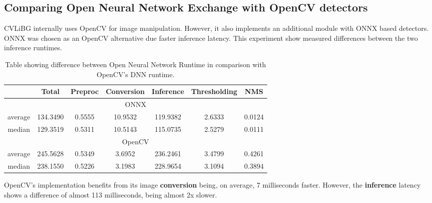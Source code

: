 \subsection{Comparing Open Neural Network Exchange with OpenCV detectors}
CVLiBG internally uses OpenCV for image manipulation. However, it also implements an additional module with ONNX based detectors. ONNX was chosen as an OpenCV alternative due faster inference latency. This experiment show measured differences between the two inference runtimes.

\begin{table}[hbt]
\caption{Table showing difference between Open Neural Network Runtime in comparison with OpenCV's DNN runtime.}
\centering
\begin{tabular}{|ccccccc|}
\hline
\multicolumn{1}{|c|}{} &
  \multicolumn{1}{c|}{Total} &
  \multicolumn{1}{c|}{Preproc} &
  \multicolumn{1}{c|}{Conversion} &
  \multicolumn{1}{c|}{Inference} &
  \multicolumn{1}{c|}{Thresholding} &
  NMS \\ \hline
\multicolumn{7}{|c|}{ONNX} \\ \hline
\multicolumn{1}{|c|}{average} &
  \multicolumn{1}{c|}{134.3490} &
  \multicolumn{1}{c|}{0.5555} &
  \multicolumn{1}{c|}{10.9532} &
  \multicolumn{1}{c|}{119.9382} &
  \multicolumn{1}{c|}{2.6333} &
  0.0124 \\ \hline
\multicolumn{1}{|c|}{median} &
  \multicolumn{1}{c|}{129.3519} &
  \multicolumn{1}{c|}{0.5311} &
  \multicolumn{1}{c|}{10.5143} &
  \multicolumn{1}{c|}{115.0735} &
  \multicolumn{1}{c|}{2.5279} &
  0.0111 \\ \hline
\multicolumn{7}{|c|}{OpenCV} \\ \hline
\multicolumn{1}{|c|}{average} &
  \multicolumn{1}{c|}{245.5628} &
  \multicolumn{1}{c|}{0.5349} &
  \multicolumn{1}{c|}{3.6952} &
  \multicolumn{1}{c|}{236.2461} &
  \multicolumn{1}{c|}{3.4799} &
  0.4261 \\ \hline
\multicolumn{1}{|c|}{median} &
  \multicolumn{1}{c|}{238.1550} &
  \multicolumn{1}{c|}{0.5226} &
  \multicolumn{1}{c|}{3.1983} &
  \multicolumn{1}{c|}{228.9654} &
  \multicolumn{1}{c|}{3.1094} &
  0.3894 \\ \hline
\end{tabular}
\end{table}

OpenCV's implementation benefits from its image \textbf{conversion} being, on average, 7 milliseconds faster. However, the \textbf{inference} latency shows a difference of almost 113 milliseconds, being almost 2x slower.

